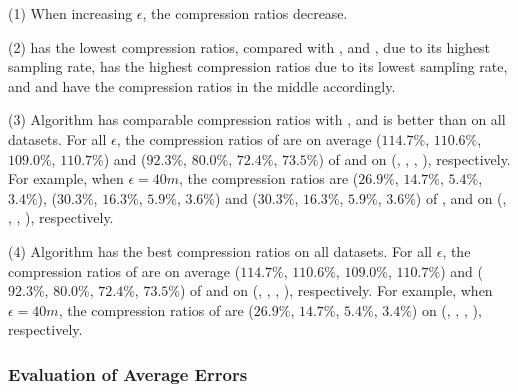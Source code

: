 \ni (1) When increasing $\epsilon$, the compression ratios decrease.


\ni (2) \pricar has the lowest compression ratios, compared with \truck, \sercar and \geolife, due to its highest sampling rate,
\truck has the highest compression ratios due to its lowest sampling rate, and \sercar and \geolife have the compression ratios in the middle accordingly.

\ni \textcolor[rgb]{1.00,0.00,0.00}{(3)} Algorithm \cist has \textcolor[rgb]{1.00,0.00,0.00}{comparable} compression ratios with \dpa, and is better than \squishe on all datasets.
For all $\epsilon$, the compression ratios of \cist are on average ($114.7\%$, $110.6\%$, $109.0\%$, $110.7\%$) and ($92.3\%$, $80.0\%$, $72.4\%$, {$73.5\%$}) of \dpa and \squishe on (\truck, \sercar, \geolife, \pricar), respectively.
For example, when $\epsilon = 40m$, the compression ratios are ($26.9\%$, $14.7\%$, $5.4\%$, $3.4\%$), ($30.3\%$, $16.3\%$, $5.9\%$, $3.6\%$) and ($30.3\%$, $16.3\%$, $5.9\%$, $3.6\%$) of \dpa, \cista and \squishe on (\truck, \sercar, \geolife, \pricar), respectively.

\ni \textcolor[rgb]{1.00,0.00,0.00}{(4)} Algorithm \cista has \textcolor[rgb]{1.00,0.00,0.00}{the best} compression ratios on all datasets.
For all $\epsilon$, the compression ratios of \cista are on average ($114.7\%$, $110.6\%$, $109.0\%$, $110.7\%$) and ($92.3\%$, $80.0\%$, $72.4\%$, {$73.5\%$}) of \dpa and \squishe on (\truck, \sercar, \geolife, \pricar), respectively.
For example, when $\epsilon = 40m$, the compression ratios of \cista are ($26.9\%$, $14.7\%$, $5.4\%$, $3.4\%$) on (\truck, \sercar, \geolife, \pricar), respectively.







\subsubsection{Evaluation of Average Errors}



